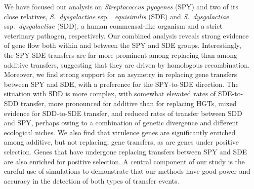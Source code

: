 \documentclass[12pt]{article}
\begin{document}
We have focused our analysis on {\em Streptococcus pyogenes}
(SPY) and two of its close relatives, {\em S.\ dysgalactiae} ssp.\ {\em
  equisimilis} (SDE) and {\em S.\ dysgalactiae} ssp.\ {\em dysgalactiae}
(SDD), a human commensal-like organism and a strict veterinary pathogen,
respectively.  Our combined analysis reveals strong evidence of gene flow
both within and between the SPY and SDE groups.  Interestingly, the SPY-SDE
transfers are far more prominent among replacing than among additive
transfers, suggesting that they are driven by homologous recombination.
Moreover, we find strong support for an asymetry in replacing gene
transfers between SPY and SDE, with a preference for the SPY-to-SDE
direction.  The situation with SDD is more complex, with somewhat elevated
rates of SDE-to-SDD transfer, more pronounced for additive than for
replacing HGTs, mixed evidence for SDD-to-SDE transfer, and reduced rates
of transfer between SDD and SPY, perhaps owing to a combination of genetic
divergence and different ecological niches.
We also find that virulence genes are significantly enriched among
additive, but not replacing, gene transfers, as are genes under positive
selection.  Genes that have undergone replacing transfers between SPY and
SDE are also enriched for positive selection.
A central component of our study is the careful use of simulations to
demonstrate that our methods have good power and accuracy in the
detection of both types of transfer events.



\end{document}
